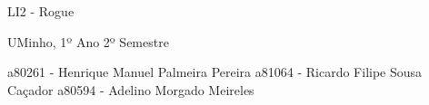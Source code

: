 L\+I2 -\/ Rogue

U\+Minho, 1º Ano 2º Semestre

a80261 -\/ Henrique Manuel Palmeira Pereira a81064 -\/ Ricardo Filipe Sousa Caçador a80594 -\/ Adelino Morgado Meireles 